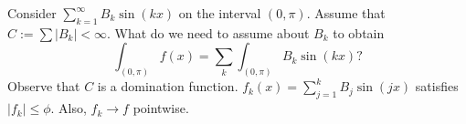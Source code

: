 \begin{ex}
Consider $\sum_{k=1}^\infty B_k \sin(kx)$ on the interval $(0,\pi)$. Assume that $C:=\sum |B_k|<\infty$. What do we need to assume about $B_k$ to obtain
	\[
	\int_{(0,\pi)} f(x) = \sum_k \int_{(0,\pi)} B_k \sin(kx)?
	\] 
Observe that $C$ is a domination function. $f_k(x) = \sum_{j=1}^k B_j \sin(jx)$ satisfies $|f_k| \leq \phi$. Also, $f_k \to f$ pointwise. 

\end{ex}








































